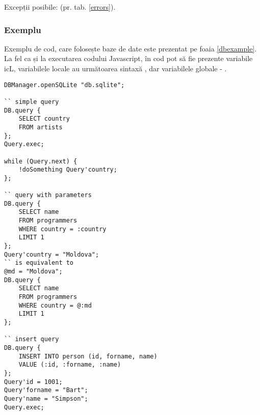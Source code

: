Excepții posibile:  (pr. tab. \ref{errors}).

\subsubsection{Exemplu}

Exemplu de cod, care folosește baze de date este prezentat pe foaia \ref{dbexample}. La fel ca și la executarea codului Javascript, în cod pot să fie prezente variabile icL, variabilele locale au următoarea sintaxă , dar variabilele globale - .

\newpage
\begin{lstlisting}[caption=Exemplu de cod care folosește baze de date, label=dbexample]
DBManager.openSQLite "db.sqlite";

`` simple query
DB.query {
	SELECT country
	FROM artists
};
Query.exec;

while (Query.next) {
	!doSomething Query'country;
};

`` query with parameters
DB.query {
	SELECT name
	FROM programmers
	WHERE country = :country
	LIMIT 1
};
Query'country = "Moldova";
`` is equivalent to
@md = "Moldova";
DB.query {
	SELECT name
	FROM programmers
	WHERE country = @:md
	LIMIT 1
};

`` insert query
DB.query {
	INSERT INTO person (id, forname, name)
	VALUE (:id, :forname, :name)
};
Query'id = 1001;
Query'forname = "Bart";
Query'name = "Simpson";
Query.exec;
\end{lstlisting}

